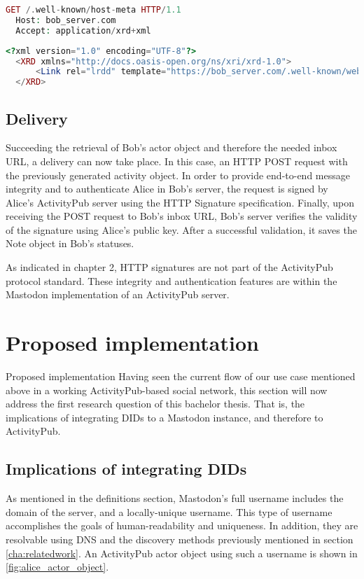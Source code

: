\begin{lstlisting}[language=PHP, caption=Hostmeta request, label=fig:hostmeta_request, float=h]
  GET /.well-known/host-meta HTTP/1.1
  Host: bob_server.com
  Accept: application/xrd+xml
\end{lstlisting}

\lstset{style=JSONStyle}
\begin{lstlisting}[language=PHP,caption=Hostmeta response, label=fig:hostmeta_response, float=h]
  <?xml version="1.0" encoding="UTF-8"?>
  <XRD xmlns="http://docs.oasis-open.org/ns/xri/xrd-1.0">
      <Link rel="lrdd" template="https://bob_server.com/.well-known/webfinger?resource={uri}"/>
  </XRD>
\end{lstlisting}


\subsection{Delivery}
Succeeding the retrieval of Bob's actor object and therefore the needed inbox URL, a delivery can now take place. In this case, an HTTP POST request with the previously generated activity object. In order to provide end-to-end message integrity and to authenticate Alice in Bob's server, the request is signed by Alice's ActivityPub server using the HTTP Signature specification.
Finally, upon receiving the POST request to Bob's inbox URL, Bob's server verifies the validity of the signature using Alice's public key. After a successful validation, it saves the Note object in Bob's statuses. 

As indicated in chapter 2, HTTP signatures are not part of the ActivityPub protocol standard. These integrity and authentication features are within the Mastodon implementation of an ActivityPub server.


\section{Proposed implementation}
Proposed implementation
Having seen the current flow of our use case mentioned above in a working ActivityPub-based social network, this section will now address the first research question of this bachelor thesis. That is, the implications of integrating DIDs to a Mastodon instance, and therefore to ActivityPub. 

\subsection{Implications of integrating DIDs}
As mentioned in the definitions section, Mastodon's full username includes the domain of the server, and a locally-unique username. This type of username accomplishes the goals of human-readability and uniqueness. In addition, they are resolvable using DNS and the discovery methods previously mentioned in section \autoref{cha:relatedwork}. An ActivityPub actor object using such a username is shown in \ref{fig:alice_actor_object}.  

